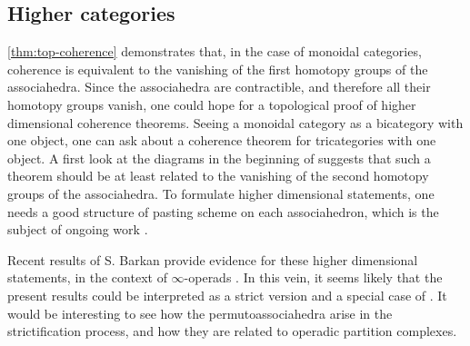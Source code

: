 \subsection{Higher categories} 
\label{sec:higher}
\cref{thm:top-coherence} demonstrates that, in the case of monoidal categories, coherence is equivalent to the vanishing of the first homotopy groups of the associahedra. 
Since the associahedra are contractible, and therefore all their homotopy groups vanish, one could hope for a topological proof of higher dimensional coherence theorems.
Seeing a monoidal category as a bicategory with one object, one can ask about a coherence theorem for tricategories with one object. 
A first look at the diagrams in the beginning of \cite[Section 2]{gordonCoherenceTricategories1995} suggests that such a theorem should be at least related to the vanishing of the second homotopy groups of the associahedra.  
To formulate higher dimensional statements, one needs a good structure of pasting scheme on each associahedron, which is the subject of ongoing work \cite{AMMLA}. 

Recent results of S. Barkan provide evidence for these higher dimensional statements, in the context of $\infty$-operads \cite{barkanArityApproximationInfty2022}.
In this vein, it seems likely that the present results could be interpreted as a strict version and a special case of \cite[Theorem B]{barkanArityApproximationInfty2022}. 
It would be interesting to see how the permutoassociahedra arise in the strictification process, and how they are related to operadic partition complexes.  



\newpage 

